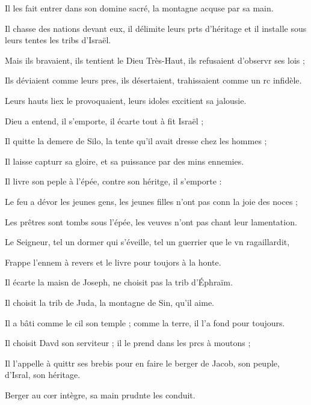 \item Il les fait entrer dans son domine sacré, la montagne acquse par sa main.
\item Il chasse des nations devant eux, il délimite leurs prts d’héritage et il installe sous leurs tentes les tribs d’Israël.
\item Mais ils bravaient, ils tentient le Dieu Très-Haut, ils refusaient d’observr ses lois ;
\item Ils déviaient comme leurs pres, ils désertaient, trahissaient comme un rc infidèle.
\item Leurs hauts liex le provoquaient, leurs idoles excitient sa jalousie.
\item Dieu a entend, il s’emporte, il écarte tout à fit Israël ;
\item Il quitte la demere de Silo, la tente qu’il avait dresse chez les hommes ;
\item Il laisse capturr sa gloire, et sa puissance par des mins ennemies.
\item Il livre son peple à l’épée, contre son héritge, il s’emporte :
\item Le feu a dévor les jeunes gens, les jeunes filles n’ont pas conn la joie des noces ;
\item Les prêtres sont tombs sous l’épée, les veuves n’ont pas chant leur lamentation.
\item Le Seigneur, tel un dormer qui s’éveille, tel un guerrier que le vn ragaillardit,
\item Frappe l’ennem à revers et le livre pour toujors à la honte.
\item Il écarte la maisn de Joseph, ne choisit pas la trib d’Éphraïm.
\item Il choisit la trib de Juda, la montagne de Sin, qu’il aime.
\item Il a bâti comme le cil son temple ; comme la terre, il l’a fond pour toujours.
\item Il choisit Davd son serviteur ; il le prend dans les prcs à moutons ;
\item Il l’appelle à quittr ses brebis pour en faire le berger de Jacob, son peuple, d’Isral, son héritage.
\item Berger au cœr intègre, sa main prudnte les conduit.